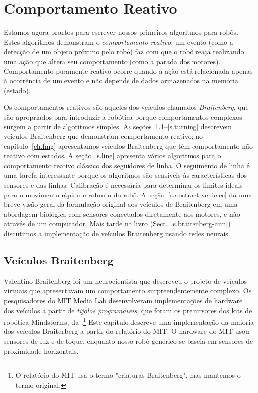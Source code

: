 
\chapter{Comportamento Reativo}\label{ch.reactive}

Estamos agora prontos para escrever nossos primeiros algoritmos para robôs. Estes algoritmos demonstram o \emph{comportamento reativo}: um evento (como a detecção de um objeto próximo pelo robô) faz com que o robô reaja realizando uma ação que altera seu comportamento (como a parada dos motores). Comportamento puramente reativo ocorre quando a ação está relacionada apenas à ocorrência de um evento e não depende de dados armazenados na memória (estado).

Os comportamentos reativos são aqueles dos veículos chamados \emph{Braitenberg}, que são apropriados para introduzir a robótica porque comportamentos complexos surgem a partir de algoritmos simples. As seções~\ref{s.braitenberg}--\ref{s.turning} descrevem veículos Braitenberg que demonstram comportamento reativo; no capítulo~\ref{ch.fmg} apresentamos veículos Braitenberg que têm comportamento não reativo com estados. A seção~\ref{s.line} apresenta vários algoritmos para o comportamento reativo clássico dos seguidores de linha. O seguimento de linha é uma tarefa interessante porque os algoritmos são sensíveis às características dos sensores e das linhas. Calibração é necessária para determinar os limites ideais para o movimento rápido e robusto do robô. A seção~\ref{s.abstract-vehicles} dá uma breve visão geral da formulação original dos veículos de Braitenberg em uma abordagem biológica com sensores conectados diretamente aos motores, e não através de um computador. Mais tarde no livro (Sect.~\ref{s.braitenberg-ann}) discutimos a implementação de veículos Braitenberg usando redes neurais.

\section{Veículos Braitenberg}\label{s.braitenberg}

Valentino Braitenberg foi um neurocientista que descreveu o projeto de veículos virtuais que apresentavam um comportamento surpreendentemente complexo. Os pesquisadores do MIT Media Lab desenvolveram implementações de hardware dos veículos a partir de \emph{tijolos programáveis}, que foram os precursores dos kits de robótica Mindstorms, da \lego.\footnote{O relatório do MIT usa o termo "criaturas Braitenberg", mas mantemos o termo original.} Este capítulo descreve uma implementação da maioria dos veículos Braitenberg a partir do relatório do MIT. O hardware do MIT usou sensores de luz e de toque, enquanto nosso robô genérico se baseia em sensores de proximidade horizontais.

